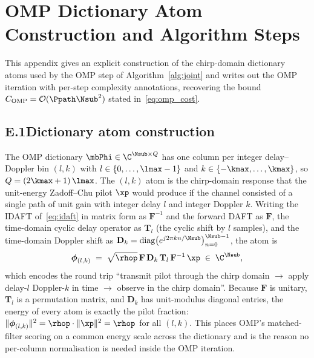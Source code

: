 
\section{OMP Dictionary Atom Construction and Algorithm Steps}
\label{app:omp}

This appendix gives an explicit construction of the chirp-domain dictionary atoms used by the OMP step of Algorithm~\ref{alg:joint} and writes out the OMP iteration with per-step complexity annotations, recovering the bound $C_\text{OMP} = \mathcal{O}(\Ppath \Nsub^2)$ stated in~\eqref{eq:omp_cost}.

\subsection*{E.1\quad Dictionary atom construction}

The OMP dictionary $\mbPhi \in \C^{\Nsub \times Q}$ has one column per integer delay--Doppler bin $(l, k)$ with $l \in \{0, \dots, \lmax - 1\}$ and $k \in \{-\kmax, \dots, \kmax\}$, so $Q = (2\kmax + 1)\,\lmax$. The $(l, k)$ atom is the chirp-domain response that the unit-energy Zadoff--Chu pilot $\xp$ would produce if the channel consisted of a single path of unit gain with integer delay $l$ and integer Doppler $k$. Writing the IDAFT of~\eqref{eq:idaft} in matrix form as $\mathbf{F}^{-1}$ and the forward DAFT as $\mathbf{F}$, the time-domain cyclic delay operator as $\mathbf{T}_l$ (the cyclic shift by $l$ samples), and the time-domain Doppler shift as $\mathbf{D}_k = \mathrm{diag}\bigl(e^{j 2\pi k n / \Nsub}\bigr)_{n=0}^{\Nsub-1}$, the atom is
\begin{equation}
\boldsymbol{\phi}_{(l,k)} \;=\; \sqrt{\rhop}\, \mathbf{F}\, \mathbf{D}_k\, \mathbf{T}_l\, \mathbf{F}^{-1}\, \xp \;\in\; \C^{\Nsub}, \label{eq:atom_construction}
\end{equation}
which encodes the round trip ``transmit pilot through the chirp domain $\to$ apply delay-$l$ Doppler-$k$ in time $\to$ observe in the chirp domain''. Because $\mathbf{F}$ is unitary, $\mathbf{T}_l$ is a permutation matrix, and $\mathbf{D}_k$ has unit-modulus diagonal entries, the energy of every atom is exactly the pilot fraction: $\|\boldsymbol{\phi}_{(l,k)}\|^2 = \rhop \cdot \|\xp\|^2 = \rhop$ for all $(l, k)$. This places OMP's matched-filter scoring on a common energy scale across the dictionary and is the reason no per-column normalisation is needed inside the OMP iteration.

